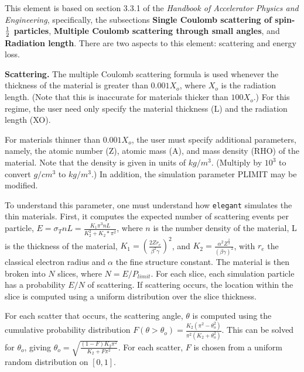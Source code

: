 This element is based on section 3.3.1 of the {\em Handbook of
Accelerator Physics and Engineering}, specifically, the
subsections {\bf Single Coulomb scattering of spin-${\rm \frac{1}{2}}$
particles}, {\bf Multiple Coulomb scattering through small angles},
and {\bf Radiation length}.
There are two aspects to this element: scattering and energy loss.

{\bf Scattering.}  The multiple Coulomb scattering formula is used
whenever the thickness of the material is greater than $0.001 X_o$,
where $X_o$ is the radiation length.  (Note that this is inaccurate
for materials thicker than $100 X_o$.)  For this regime, the user need
only specify the material thickness (L) and the radiation length (XO).

For materials thinner than $0.001 X_o$, the user must specify
additional parameters, namely, the atomic number (Z), atomic mass (A),
and mass density (RHO) of the material.  Note that the density is
given in units of $kg/m^3$.  (Multiply by $10^3$ to convert $g/cm^3$
to $kg/m^3$.)  In addition, the simulation parameter PLIMIT may be
modified.  

To understand this parameter, one must understand how {\tt elegant}
simulates the thin materials.  First, it computes the expected number
of scattering events per particle, $ E = \sigma_T n L = \frac{K_1
\pi^3 n L}{K_2^2 + K_2*\pi^2} $, where $n$ is the number density of
the material, L is the thickness of the material, $K_1 = (\frac{2 Z
r_e}{\beta^2 \gamma})^2$, and $K_2 = \frac{\alpha^2
Z^\frac{2}{3}}{(\beta\gamma)^2}$, with $r_e$ the classical electron radius
and $\alpha$ the fine structure constant.  The material is then broken
into $N$ slices, where $N = E/P_{limit}$.  For each slice, each
simulation particle has a probability $E/N$ of scattering.  If scattering
occurs, the location within the slice is computed using a uniform
distribution over the slice thickness.

For each scatter that occurs, the scattering angle, $\theta$ is
computed using the cumulative probability distribution
$F(\theta>\theta_o) = \frac{K_2 (\pi^2 - \theta_o^2)}{\pi^2 (K_2 +
\theta_o^2)}$.  This can be solved for $\theta_o$, giving
$\theta_o = \sqrt{\frac{(1-F)K_2\pi^2}{K_2 + F \pi^2}}$.  For each scatter,
$F$ is chosen from a uniform random distribution on $[0,1]$.

